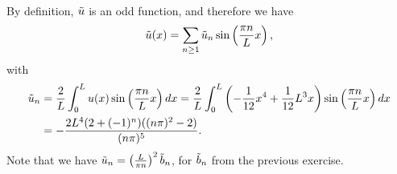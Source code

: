 \documentclass[11pt]{article}
\begin{document}
\begin{solution}
\begin{align*}
\end{align*}
By definition, $\Tilde u$ is an odd function, and therefore we have
\begin{align*}
    \Tilde u(x) = \sum_{n \geq 1} \Tilde u_n \sin\left(\frac{\pi n}{L} x\right),
\end{align*}
with
\begin{align*}
    \Tilde u_n &= \frac{2}{L} \int_0^L u(x) \sin\left(\frac{\pi n}{L} x\right) dx = \frac{2}{L} \int_0^L \left(-\frac{1}{12} x^4 + \frac{1}{12} L^3 x\right) \sin\left(\frac{\pi n}{L} x\right) dx\\
    &= -\frac{2 L^4 (2 + (-1)^n)((n \pi)^2 - 2)}{(n \pi)^5}.
\end{align*}
Note that we have $\Tilde u_n = \left(\frac{L}{\pi n}\right)^2 \Tilde{b}_n$, for $\Tilde b_n$ from the previous exercise.
\end{solution}
\end{document}
